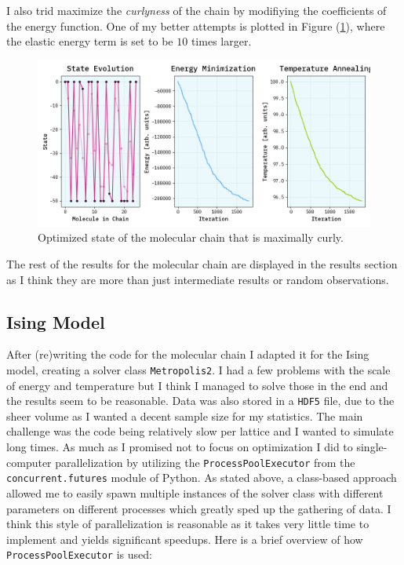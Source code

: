\documentclass[10pt, titlepage, a4paper]{article}
\begin{document}
I also trid maximize the \textit{curlyness} of the chain by modifiying the coefficients of the energy function. One of my better attempts is plotted 
in Figure (\ref{fig:curly-chain}), where the elastic energy term is set to be $10$ times larger.

\begin{figure}[H]
    \centering
    \includegraphics[width=.95\textwidth]{../curly-boi-Beta10.png}
    \caption{Optimized state of the molecular chain that is maximally curly.}
    \label{fig:curly-chain}
\end{figure}

The rest of the results for the molecular chain are displayed in the results section as I think they are more than just intermediate results or 
random observations.

\subsection{Ising Model}
After (re)writing the code for the molecular chain I adapted it for the Ising model, creating a solver class \texttt{Metropolis2}. I had a few problems
with the scale of energy and temperature but I think I managed to solve those in the end and the results seem to be reasonable. Data was also stored in 
a \texttt{HDF5} file, due to the sheer volume as I wanted a decent sample size for my statistics. The main challenge was the code being relatively slow 
per lattice and I wanted to simulate long times. As much as I promised not to focus on optimization I did to single-computer parallelization by utilizing
the \texttt{ProcessPoolExecutor} from the \texttt{concurrent.futures} module of Python. As stated above, a class-based approach allowed me to easily
spawn multiple instances of the solver class with different parameters on different processes which greatly sped up the gathering of data. I think this 
style of parallelization is reasonable as it takes very little time to implement and yields significant speedups. Here is 
a brief overview of how \texttt{ProcessPoolExecutor} is used:
\end{document}
